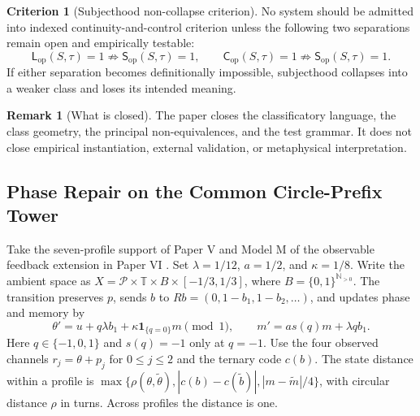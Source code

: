 \documentclass[11pt,a4paper]{article}
\theoremstyle{definition}
\newtheorem{remark}[proposition]{Remark}
\newtheorem{criterion}[proposition]{Criterion}
\newcommand{\Cop}{\mathsf{C}_{\mathrm{op}}}
\newcommand{\Lop}{\mathsf{L}_{\mathrm{op}}}
\newcommand{\Subop}{\mathsf{S}_{\mathrm{op}}}
\begin{document}
\begin{criterion}[Subjecthood non-collapse criterion]
No system should be admitted into indexed continuity-and-control criterion unless the following two separations remain open and empirically testable:
\[
\Lop(S,\tau)=1 \not\Rightarrow \Subop(S,\tau)=1,
\qquad
\Cop(S,\tau)=1 \not\Rightarrow \Subop(S,\tau)=1.
\]
If either separation becomes definitionally impossible, subjecthood collapses into a weaker class and loses its intended meaning.
\end{criterion}

\begin{remark}[What is closed]
The paper closes the classificatory language, the class geometry, the principal non-equivalences, and the test grammar. It does not close empirical instantiation, external validation, or metaphysical interpretation.
\end{remark}

\subsection{Phase Repair on the Common Circle-Prefix Tower}

Take the seven-profile support of Paper V \cite{paper5} and Model M of the observable feedback extension in Paper VI \cite{paper6}. Set $\lambda=1/12$, $a=1/2$, and $\kappa=1/8$. Write the ambient space as $X=\mathcal P\times\mathbb T\times B\times[-1/3,1/3]$, where $B=\{0,1\}^{\mathbb N_{>0}}$. The transition preserves $p$, sends $b$ to $Rb=(0,1-b_1,1-b_2,\ldots)$, and updates phase and memory by
\[
 \theta'=u+q\lambda b_1+\kappa\mathbf 1_{\{q=0\}}m \pmod 1,
 \qquad
 m'=a s(q)m+\lambda q b_1 .
\]
Here $q\in\{-1,0,1\}$ and $s(q)=-1$ only at $q=-1$. Use the four observed channels $r_j=\theta+p_j$ for $0\le j\le 2$ and the ternary code $c(b)$. The state distance within a profile is $\max\{\rho(\theta,\tilde\theta),|c(b)-c(\tilde b)|,|m-\tilde m|/4\}$, with circular distance $\rho$ in turns. Across profiles the distance is one.
\end{document}

